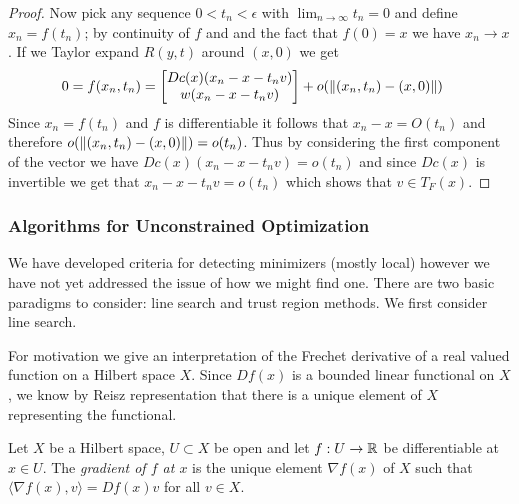 \begin{proof}
Now pick any sequence $0 < t_n < \epsilon$ with $\lim_{n \to \infty} t_n = 0$ and define $x_n = f(t_n)$; by continuity of $f$ and and the 
fact that $f(0) = x$ we have $x_n \to x$.  If we Taylor expand $R(y,t)$ around $(x,0)$ we get
\begin{align*}
0 &= f(x_n, t_n) = \begin{bmatrix}
Dc(x) (x_n - x - t_n v) \\
w(x_n - x - t_n v)
\end{bmatrix}
+ o(\lVert (x_n,t_n) - (x,0) \rVert)
\end{align*}
Since $x_n = f(t_n)$ and $f$ is differentiable it follows that $x_n - x = O(t_n)$ and therefore $o(\lVert (x_n,t_n) - (x,0) \rVert) = o(t_n)$.  Thus by
considering the first component of the vector we have $Dc(x)  (x_n - x - t_n v)  = o(t_n)$ and since 
$Dc(x)$ is invertible we get that $x_n - x -t_n v = o(t_n)$ which shows that $v \in T_F(x)$.
\end{proof}

\subsubsection{Algorithms for Unconstrained Optimization}

We have developed criteria for detecting minimizers (mostly local)
however we have not yet addressed the issue of how we might find one.
There are two basic paradigms to consider: line search and trust
region methods.  We first consider line search.

For motivation we give an interpretation of the Frechet derivative of
a real valued function on a Hilbert space $X$.  Since $Df(x)$ is a
bounded linear functional on $X$, we know by Reisz
representation that there is a unique element of $X$ representing the
functional.

\begin{defn}Let $X$ be a Hilbert space, $U \subset X$ be open and let
  $f : U \to \mathbb{R}$ be differentiable at $x \in U$.  The
  \emph{gradient of $f$ at $x$} is the unique element $\nabla f(x)$ of
  $X$ such that $\langle \nabla f(x), v \rangle = Df(x) v$ for all $v
  \in X$.
\end{defn}

